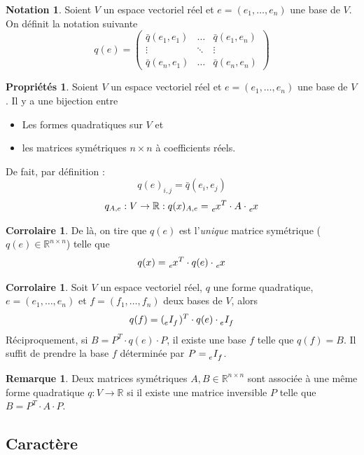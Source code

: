 \documentclass[11pt,a4paper]{article}
\theoremstyle{definition}
\newtheorem{mynota}[mydef]{Notation}
\newtheorem{myprop}[mydef]{Propriétés}
\newtheorem{myrem}[mydef]{Remarque}
\newtheorem{mycorr}[mydef]{Corrolaire}
\newcommand{\R}{\mathbb{R}}
\newcommand{\Rnn}{\R^{n \times n}}
\begin{document}
\begin{mynota}
	Soient $V$ un espace vectoriel réel et $e = (e_1, \dots , e_n)$ une base de $V$.
	On définit la notation suivante
	\[ q(e) =
	\begin{pmatrix}
		\bar{q}(e_1,e_1) & \ldots & \bar{q}(e_1,e_n)\\
		\vdots & \ddots & \vdots\\
		\bar{q}(e_n,e_1) & \ldots & \bar{q}(e_n,e_n)
	\end{pmatrix}
	\]
\end{mynota}

\begin{myprop}
	Soient $V$ un espace vectoriel réel et $e = (e_1, \dots , e_n)$ une base de $V$.
	Il y a une bijection entre
	\begin{itemize}
		\item Les formes quadratiques sur $V$ et
		\item les matrices symétriques $n \times n$ à coefficients réels.
	\end{itemize}
	De fait, par définition :
	\[ q(e)_{i,j} = \bar{q}(e_i, e_j) \]
	\[ q_{A,e} : V \rightarrow \R : q(x)_{A,e} = \tensor[_e]{x}{^T} \cdot A \cdot \tensor[_e]{x}{} \]
\end{myprop}

\begin{mycorr}
	De là, on tire que $q(e)$ est l'\emph{unique} matrice symétrique ($q(e) \in \Rnn$) telle que
	\[ q(x) = \tensor[_e]{x}{^T} \cdot q(e) \cdot \tensor[_e]{x}{} \]
\end{mycorr}

\begin{mycorr} Soit $V$ un espace vectoriel réel, $q$ une forme quadratique, $e = (e_1, \dots , e_n)$ et $f = (f_1, \dots, f_n)$ deux bases de $V$, alors
	\[ q(f) = (\tensor[_e]{I}{_f})^T \cdot q(e) \cdot \tensor[_e]{I}{_f} \]
	Réciproquement, si $B = P^T \cdot q(e) \cdot P$, il existe une base $f$ telle que $q(f) = B$.
	Il suffit de prendre la base $f$ déterminée par $P = \tensor[_e]{I}{_f}$.
\end{mycorr}

\begin{myrem}
	Deux matrices symétriques $A, B \in \Rnn$ sont associée à une même forme quadratique $q: V \to \R$ si il existe une matrice inversible $P$ telle que $B = P^T \cdot A \cdot P$.
\end{myrem}

\subsection{Caractère}
\end{document}
